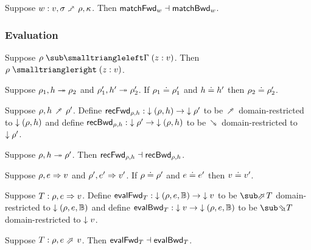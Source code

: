\begin{theorem}
\label{thm:core-language:match:gc}
   Suppose $w: v, \sigma \matchFwdS \rho, \kappa$.  Then $\mathsf{matchFwd}_{w} \dashv \mathsf{matchBwd}_{w}$.
\end{theorem}

\subsubsection{Evaluation}





\begin{lemma}
\label{lem:core-language:env-get-put}
   Suppose $\envLookupBwd{\rho}{\Gamma}{\bind{z}{v}}$. Then $\envLookup{\rho}{z}{v}$.
\end{lemma}

\begin{lemma}
    Suppose $\rho_1, h \mathrel{\twoheadrightarrow} \rho_2$ and $\rho_1', h' \mathrel{\twoheadrightarrow} \rho_2'$. If $\rho_1 \doteq \rho_1'$ and $h \doteq h'$ then $\rho_2 \doteq \rho_2'$.
\end{lemma}

\begin{definition}
   Suppose $\rho, h \closeDefsFwdR \rho'$. Define $\mathsf{recFwd}_{\rho,h}: {\downarrow{(\rho, h)}} \to {\downarrow{\rho'}}$ to be $\closeDefsFwdR$ domain-restricted to ${\downarrow{(\rho, h)}}$ and define $\mathsf{recBwd}_{\rho,h}: {\downarrow{\rho'}} \to {\downarrow{(\rho, h)}}$ to be $\closeDefsBwdR$ domain-restricted to ${\downarrow{\rho'}}$.
\end{definition}

\begin{theorem}
\label{thm:core-language:closeDefs:gc}
   Suppose $\rho, h \mathrel{\twoheadrightarrow} \rho'$.  Then $\mathsf{recFwd}_{\rho,h} \dashv \mathsf{recBwd}_{\rho,h}$.
\end{theorem}

\begin{lemma}
   Suppose $\rho, e \mathrel{\Rightarrow} v$ and $\rho', e' \mathrel{\Rightarrow} v'$. If $\rho \doteq \rho'$ and $e \doteq e'$ then $v \doteq v'$.
\end{lemma}

\begin{definition}
   Suppose $T: \rho, e \mathrel{\Rightarrow} v$. Define $\mathsf{evalFwd}_{T}: {\downarrow{(\rho, e, \mathbb{B})}} \to {\downarrow{v}}$ to be $\evalFwdR{T}$ domain-restricted to ${\downarrow{(\rho, e, \mathbb{B})}}$ and define $\mathsf{evalBwd}_{T}: {\downarrow{v}} \to {\downarrow{(\rho, e, \mathbb{B})}}$ to be $\evalBwdR{T}$ domain-restricted to ${\downarrow{v}}$.
\end{definition}

\begin{theorem}
\label{thm:core-language:eval:gc}
   Suppose $T: \rho, e \evalFwdS v$.  Then $\mathsf{evalFwd}_{T} \dashv \mathsf{evalBwd}_{T}$.
\end{theorem}
